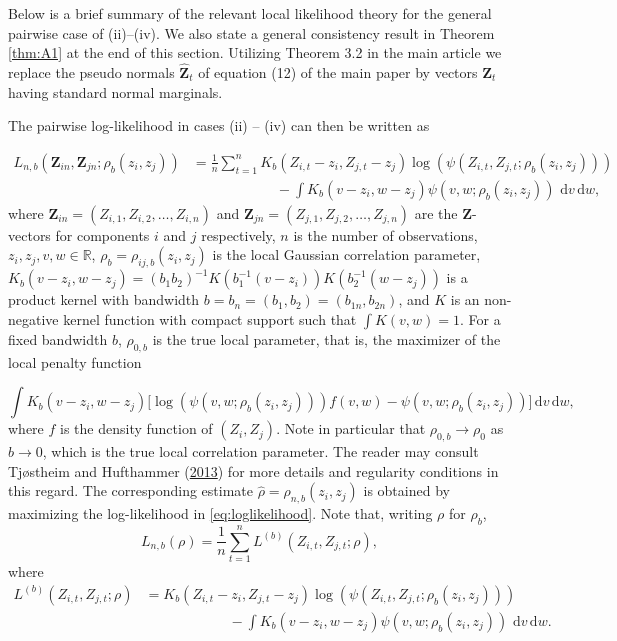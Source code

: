 \documentclass[
  12pt,
  letterpaper]{article}
\numberwithin{equation}{section}
\newcommand{\Z}{\bm{Z}}
\newcommand{\hfZ}{\widehat{\bm{Z}}}
\newcommand{\di}{\,\textrm{d}}
\begin{document}
Below is a brief summary of the relevant local likelihood theory for the general pairwise case of (ii)--(iv). We also state a general consistency result in Theorem \ref{thm:A1} at the end of this section. Utilizing Theorem 3.2 in the main article we replace the pseudo normals \(\hfZ_t\) of equation (12) of the main paper by vectors \(\Z_t\) having standard normal marginals.

The pairwise log-likelihood in cases (ii) -- (iv) can then be written as

\begin{align}
L_{n,b}(\Z_{in}, \Z_{jn}; \rho_b(z_i, z_j)) &= \frac{1}{n}\sum_{t=1}^n K_b(Z_{i,t} - z_i, Z_{j,t} - z_j)\log\left(\psi(Z_{i,t}, Z_{j,t}; \rho_b(z_i, z_j))\right) \nonumber \\  
& \qquad\qquad\qquad - \int K_b(v-z_i, w- z_j)\psi(v,w;\rho_b(z_i, z_j)) \, \di v \di w,
\label{eq:loglikelihood}
\end{align}
where \(\Z_{in} = (Z_{i,1}, Z_{i,2}, \ldots, Z_{i,n})\) and \(\Z_{jn} = (Z_{j,1}, Z_{j,2}, \ldots, Z_{j,n})\) are the \(\Z\)-vectors for components \(i\) and \(j\) respectively, \(n\) is the number of observations, \(z_i, z_j, v, w \in \mathbb{R}\), \(\rho_b = \rho_{ij,b}(z_i,z_j)\) is the local Gaussian correlation parameter, \(K_b(v-z_i, w-z_j) = (b_1b_2)^{-1}K(b_1^{-1}(v-z_i))K(b_2^{-1}(w-z_j))\) is a product kernel with bandwidth \(b=b_n=(b_1,b_2) = (b_{1n}, b_{2n})\), and \(K\) is an non-negative kernel function with compact support such that \(\int K(v,w) = 1\). For a fixed bandwidth \(b\), \(\rho_{0,b}\) is the true local parameter, that is, the maximizer of the local penalty function

\begin{equation}
\int K_b(v-z_i, w-z_j)\big[\log(\psi(v,w; \rho_b(z_i, z_j)))f(v,w) - \psi(v,w; \rho_b(z_i, z_j))\big] \di v \di w,
\label{eq:penalty}
\end{equation}
where \(f\) is the density function of \((Z_i, Z_j)\). Note in particular that \(\rho_{0,b} \rightarrow \rho_0\) as \(b\rightarrow0\), which is the true local correlation parameter. The reader may consult Tjøstheim and Hufthammer (\protect\hyperlink{ref-tjostheim2013local}{2013}) for more details and regularity conditions in this regard. The corresponding estimate \(\widehat \rho = \rho_{n, b}(z_i,z_j)\) is obtained by maximizing the log-likelihood in \eqref{eq:loglikelihood}. Note that, writing \(\rho\) for \(\rho_b\),
\begin{equation}
L_{n,b}(\rho) = \frac{1}{n}\sum_{t=1}^n L^{(b)}(Z_{i,t}, Z_{j,t}; \rho),
\end{equation}
where
\begin{align}
L^{(b)}(Z_{i,t}, Z_{j,t}; \rho) &= K_b(Z_{i,t} - z_i, Z_{j,t} - z_j)\log\left(\psi(Z_{i,t}, Z_{j,t}; \rho_b(z_i, z_j))\right) \nonumber \\  
& \qquad\qquad\qquad - \int K_b(v-z_i, w- z_j)\psi(v,w;\rho_b(z_i, z_j)) \, \di v \di w.
\label{eq:A16}
\end{align}
\end{document}

